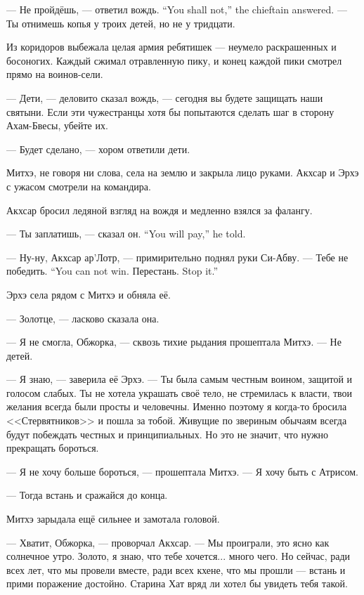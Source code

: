 {--- Не пройдёшь, --- ответил вождь.}
{``You shall not,'' the chieftain answered.}
--- Ты отнимешь копья у троих детей, но не у тридцати.

Из коридоров выбежала целая армия ребятишек --- неумело раскрашенных и босоногих.
Каждый сжимал отравленную пику, и конец каждой пики смотрел прямо на воинов-сели.

--- Дети, --- деловито сказал вождь, --- сегодня вы будете защищать наши святыни.
Если эти чужестранцы хотя бы попытаются сделать шаг в сторону Ахам-Бвесы, убейте их.

--- Будет сделано, --- хором ответили дети.

Митхэ, не говоря ни слова, села на землю и закрыла лицо руками.
Акхсар и Эрхэ с ужасом смотрели на командира.

Акхсар бросил ледяной взгляд на вождя и медленно взялся за фалангу.

{--- Ты заплатишь, --- сказал он.}
{``You will pay,'' he told.}

--- Ну-ну, Акхсар ар’Лотр, --- примирительно поднял руки Си-Абву.
{--- Тебе не победить.}
{``You can not win.}
{Перестань.}
{Stop it.''}

Эрхэ села рядом с Митхэ и обняла её.

--- Золотце, --- ласково сказала она.

--- Я не смогла, Обжорка, --- сквозь тихие рыдания прошептала Митхэ.
--- Не детей.

--- Я знаю, --- заверила её Эрхэ.
--- Ты была самым честным воином, защитой и голосом слабых.
Ты не хотела украшать своё тело, не стремилась к власти, твои желания всегда были просты и человечны.
Именно поэтому я когда-то бросила <<Стервятников>> и пошла за тобой.
Живущие по звериным обычаям всегда будут побеждать честных и принципиальных.
Но это не значит, что нужно прекращать бороться.

--- Я не хочу больше бороться, --- прошептала Митхэ.
--- Я хочу быть с Атрисом.

--- Тогда встань и сражайся до конца.

Митхэ зарыдала ещё сильнее и замотала головой.

--- Хватит, Обжорка, --- проворчал Акхсар.
--- Мы проиграли, это ясно как солнечное утро.
Золото, я знаю, что тебе хочется... много чего.
Но сейчас, ради всех лет, что мы провели вместе, ради всех кхене, что мы прошли --- встань и прими поражение достойно.
Старина Хат вряд ли хотел бы увидеть тебя такой.

